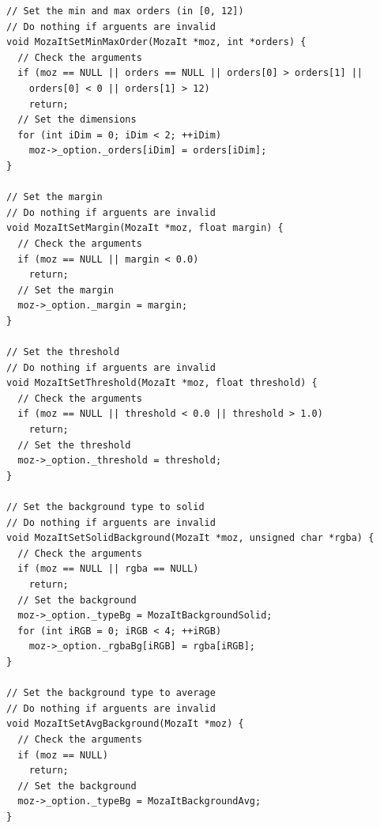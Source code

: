 \documentclass[12pt, a4paper]{article}
\begin{document}
\begin{scriptsize}
\begin{ttfamily}
\begin{lstlisting}
// Set the min and max orders (in [0, 12])
// Do nothing if arguents are invalid
void MozaItSetMinMaxOrder(MozaIt *moz, int *orders) {
  // Check the arguments
  if (moz == NULL || orders == NULL || orders[0] > orders[1] || 
    orders[0] < 0 || orders[1] > 12)
    return;
  // Set the dimensions
  for (int iDim = 0; iDim < 2; ++iDim)
    moz->_option._orders[iDim] = orders[iDim];
}

// Set the margin
// Do nothing if arguents are invalid
void MozaItSetMargin(MozaIt *moz, float margin) {
  // Check the arguments
  if (moz == NULL || margin < 0.0)
    return;
  // Set the margin
  moz->_option._margin = margin;
}

// Set the threshold
// Do nothing if arguents are invalid
void MozaItSetThreshold(MozaIt *moz, float threshold) {
  // Check the arguments
  if (moz == NULL || threshold < 0.0 || threshold > 1.0)
    return;
  // Set the threshold
  moz->_option._threshold = threshold;
}

// Set the background type to solid
// Do nothing if arguents are invalid
void MozaItSetSolidBackground(MozaIt *moz, unsigned char *rgba) {
  // Check the arguments
  if (moz == NULL || rgba == NULL)
    return;
  // Set the background
  moz->_option._typeBg = MozaItBackgroundSolid;
  for (int iRGB = 0; iRGB < 4; ++iRGB)
    moz->_option._rgbaBg[iRGB] = rgba[iRGB];
}

// Set the background type to average
// Do nothing if arguents are invalid
void MozaItSetAvgBackground(MozaIt *moz) {
  // Check the arguments
  if (moz == NULL)
    return;
  // Set the background
  moz->_option._typeBg = MozaItBackgroundAvg;
}


\end{lstlisting}
\end{ttfamily}
\end{scriptsize}
\end{document}
